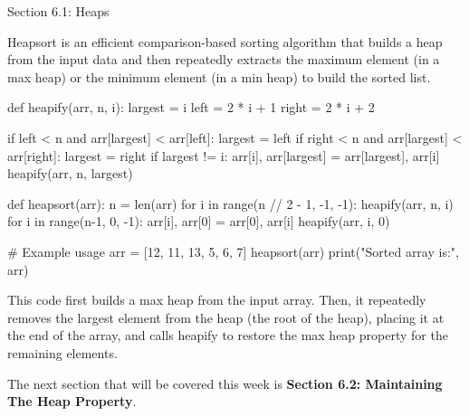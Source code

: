 \begin{notes}{Section 6.1: Heaps}
    \begin{highlight}
        Heapsort is an efficient comparison-based sorting algorithm that builds a heap from the input data and then repeatedly extracts the maximum element (in a max heap) or the minimum element 
        (in a min heap) to build the sorted list.
    \begin{code}[Python]
    def heapify(arr, n, i):
        largest = i
        left = 2 * i + 1
        right = 2 * i + 2
        
        if left < n and arr[largest] < arr[left]:
            largest = left
        if right < n and arr[largest] < arr[right]:
            largest = right
        if largest != i:
            arr[i], arr[largest] = arr[largest], arr[i]
            heapify(arr, n, largest)
    
    def heapsort(arr):
        n = len(arr)
        for i in range(n // 2 - 1, -1, -1):
            heapify(arr, n, i)
        for i in range(n-1, 0, -1):
            arr[i], arr[0] = arr[0], arr[i]
            heapify(arr, i, 0)
    
    # Example usage
    arr = [12, 11, 13, 5, 6, 7]
    heapsort(arr)
    print("Sorted array is:", arr)
    \end{code}
        
        This code first builds a max heap from the input array. Then, it repeatedly removes the largest element from the heap (the root of the heap), placing it at the end of the array, and calls 
        heapify to restore the max heap property for the remaining elements.
    \end{highlight}    
\end{notes}

The next section that will be covered this week is \textbf{Section 6.2: Maintaining The Heap Property}.

